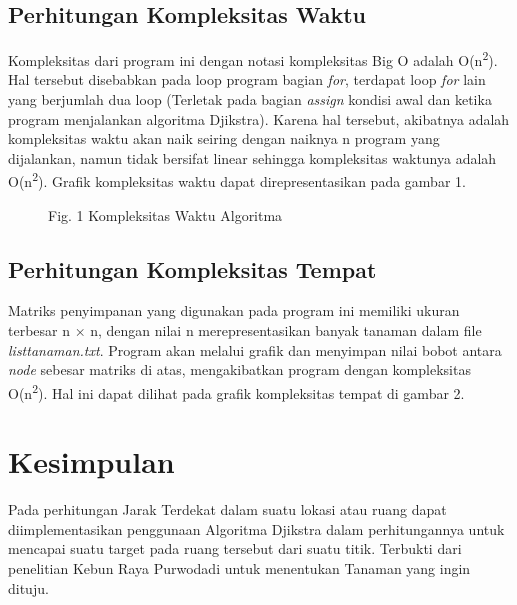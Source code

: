 \documentclass[conference]{IEEEtran}
\begin{document}
\subsection{Perhitungan Kompleksitas Waktu}
Kompleksitas dari program ini dengan notasi kompleksitas Big O adalah O(n\textsuperscript{2}). Hal tersebut disebabkan pada loop program bagian \textit{for}, terdapat loop \textit{for} lain yang berjumlah dua loop (Terletak pada bagian \textit{assign} kondisi awal dan ketika program menjalankan algoritma Djikstra). Karena hal tersebut, akibatnya adalah kompleksitas waktu akan naik seiring dengan naiknya n program yang dijalankan, namun tidak bersifat linear sehingga kompleksitas waktunya
adalah O(n\textsuperscript{2}). Grafik kompleksitas waktu dapat direpresentasikan pada gambar 1.
\begin{figure}[htbp]
    \caption{Fig. 1 Kompleksitas Waktu Algoritma}
    
\end{figure}
 
\subsection{Perhitungan Kompleksitas Tempat}
Matriks penyimpanan yang digunakan pada program ini memiliki ukuran terbesar n × n, dengan nilai n merepresentasikan banyak tanaman dalam file \textit{listtanaman.txt}. Program akan melalui grafik dan menyimpan nilai bobot antara \textit{node} sebesar matriks di atas, mengakibatkan program dengan kompleksitas O(n\textsuperscript{2}). Hal ini dapat dilihat pada grafik kompleksitas tempat di gambar 2.
 
\section{Kesimpulan}
Pada perhitungan Jarak Terdekat dalam suatu lokasi atau ruang dapat diimplementasikan penggunaan Algoritma Djikstra dalam perhitungannya untuk mencapai suatu target pada ruang tersebut dari suatu titik. Terbukti dari penelitian Kebun Raya Purwodadi untuk menentukan Tanaman yang ingin dituju.


\end{document}
